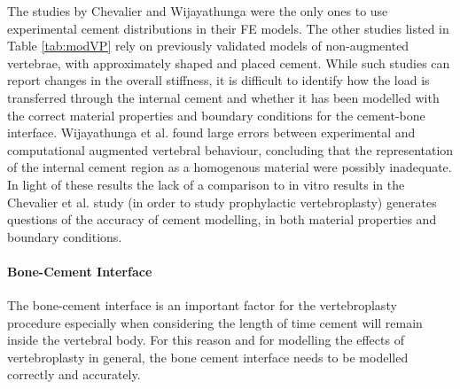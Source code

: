 The studies by Chevalier \cite{Chevalier2008} and Wijayathunga
\cite{Wijayathunga2008} were
the
only ones to use experimental cement distributions in their FE
models. The other studies listed in Table \ref{tab:modVP} rely on
previously validated
models of non-augmented vertebrae, with approximately shaped and placed
cement. While such studies can report changes in the overall stiffness,
it is difficult to identify how the load is transferred through the
internal cement and whether it has been modelled with the correct
material properties and boundary conditions for the cement-bone
interface. Wijayathunga et al. \cite{Wijayathunga2008} found large errors
between
experimental and computational augmented vertebral behaviour, concluding
that the representation of the internal cement region as a homogenous
material were possibly inadequate. In light of these results the lack of
a comparison to in vitro results in the Chevalier et al. \cite{Chevalier2008}
study
(in order to study prophylactic vertebroplasty) generates questions of
the accuracy of cement modelling, in both material properties and
boundary conditions.

\paragraph{Bone-Cement Interface}\label{bone-cement-interface}

The bone-cement interface is an important factor for the vertebroplasty
procedure especially when considering the length of time cement will
remain inside the vertebral body. For this reason and for modelling the
effects of vertebroplasty in general, the bone cement interface needs to
be modelled correctly and accurately.

